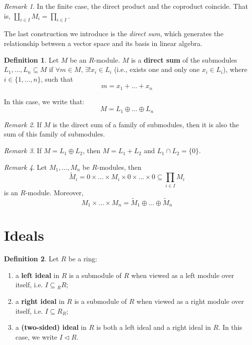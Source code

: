 \documentclass[12pt, a4paper, titlepage]{report}
\theoremstyle{plain} %
\theoremstyle{definition}
\newtheorem{defn}{Definition}[section]
\theoremstyle{remark}
\newtheorem*{rem}{Remark}
\begin{document}
\begin{rem}
  In the finite case, the direct product and the coproduct coincide. That is,
  $\coprod_{i \in I} M_i = \prod_{i \in I}$.
\end{rem}

The last construction we introduce is the \textit{direct sum}, which generates the relationship between
a vector space and its basis in linear algebra.

\begin{defn}
  Let $M$ be an $R$-module. $M$ is a \textbf{direct sum} of the submodules $L_1, ..., L_n \subseteq M$
  if $\forall m \in M$, $\exists! x_i \in L_i$ (i.e., exists one and only one $x_i \in L_i$),
  where $i \in \{ 1, ..., n \}$, such that
  \[
    m = x_1 + ... + x_n
  \]

  In this case, we write that:
  \[
    M = L_1 \oplus ... \oplus L_n
  \]
\end{defn}

\begin{rem}
  If $M$ is the direct sum of a family of submodules, then it is also the sum of this family of submodules.
\end{rem}

\begin{rem}
  If $M = L_1 \oplus L_2$, then $M = L_1 + L_2$ and $L_1 \cap L_2 = \{0\}$.
\end{rem}

\begin{rem}
  Let $M_1, ..., M_n$ be $R$-modules, then
  \[
    \widetilde{M}_i = 0 \times ... \times M_i \times 0 \times ... \times 0 \subseteq \prod_{i \in I} M_i
  \]
  is an $R$-module. Moreover,
  \[
    M_1 \times ... \times M_n = \widetilde{M}_1 \oplus ... \oplus \widetilde{M}_n 
  \]

\end{rem}

\section{Ideals}

\begin{defn}
  Let $R$ be a ring:

  \begin{enumerate}
  \item a \textbf{left ideal} in $R$ is a submodule of $R$ when viewed as a left module over itself, i.e.
    $I \subseteq {}_RR$;
  \item a \textbf{right ideal} in $R$ is a submodule of $R$ when viewed as a right module over itself, i.e.
    $I \subseteq R_R$;
  \item a \textbf{(two-sided) ideal} in $R$ is both a left ideal and a right ideal in $R$. In this case, we
    write $I \lhd R$.
  \end{enumerate}
\end{defn}
\end{document}
